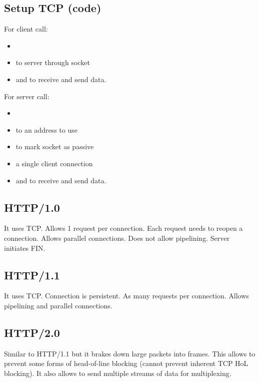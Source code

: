 \subsection{Setup TCP (code)}
For client call:
\begin{footnotesize}
  \begin{itemize}[itemsep=-0.5em]
    \item {}
    \item {} to server through socket
    \item {} and  to receive and send data.
  \end{itemize}
\end{footnotesize}
For server call:
\begin{footnotesize}
  \begin{itemize}[itemsep=-0.5em]
    \item {}
    \item {} to an address to use
    \item {} to mark socket as passive
    \item {} a single client connection
    \item {} and  to receive and send data.
  \end{itemize}
\end{footnotesize}
\subsection{HTTP/1.0}
It uses TCP. Allows 1 request per connection. Each request needs to
reopen a connection. Allows parallel connections. Does not allow
pipelining. Server initiates FIN.
\subsection{HTTP/1.1}
It uses TCP. Connection is persistent. As many requests per connection.
Allows pipelining and parallel connections.
\subsection{HTTP/2.0}
Similar to HTTP/1.1 but it brakes down large packets into frames. This
allows to prevent some forms of head-of-line blocking (cannot prevent
inherent TCP HoL blocking). It also allows to send multiple streams of
data for multiplexing.
